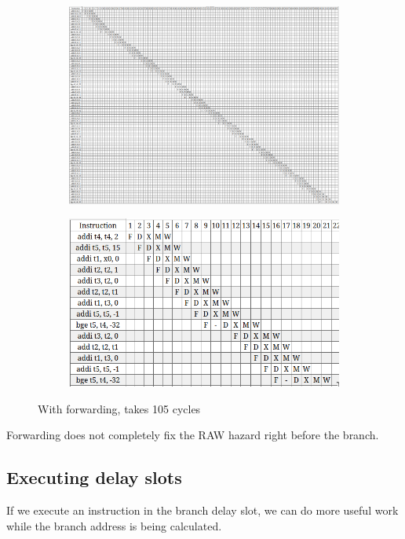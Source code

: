 \documentclass[11pt]{article}
\begin{document}
\begin{figure}[H]
\begin{subfigure}{.5\textwidth}
  \centering
  \includegraphics[width=\linewidth]{q1/nox/bad/f-105.png}
\end{subfigure}
\begin{subfigure}{.5\textwidth}
  \centering
  \includegraphics[width=\linewidth]{q1/nox/bad/f-loop.png}
\end{subfigure}
\caption{With forwarding, takes 105 cycles}
\end{figure}

Forwarding does not completely fix the RAW hazard right before the branch.

\newpage

\subsection{Executing delay slots}
If we execute an instruction in the branch delay slot, we can do more useful work while the branch address is being calculated.
\end{document}
